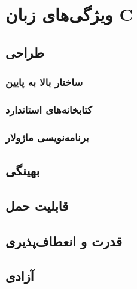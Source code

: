 \chapter{ویژگی‌های زبان C}
\section{طراحی}
\subsection{ساختار بالا به پایین}
\subsection{کتابخانه‌های استاندارد}
\subsection{برنامه‌نویسی ماژولار}
\section{بهینگی}
\section{قابلیت حمل}
\section{قدرت و انعطاف‌پذیری}
\section{آزادی}
